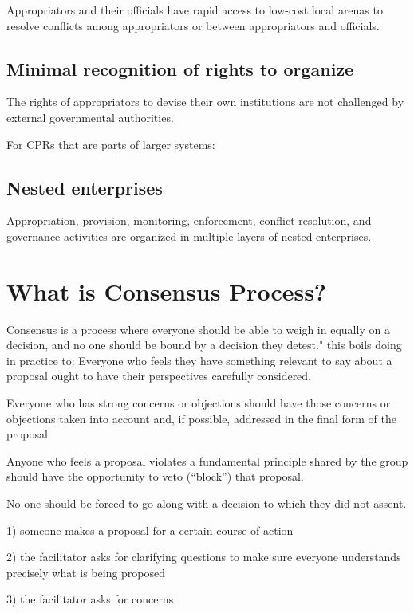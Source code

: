 \documentclass{article}
\begin{document}
Appropriators and their officials have rapid access to low-cost local arenas to resolve conflicts among appropriators or between appropriators and officials.

\subsection{Minimal recognition of rights to organize}

The rights of appropriators to devise their own institutions are not challenged by external governmental authorities.

For CPRs that are parts of larger systems:

\subsection{Nested enterprises}

Appropriation, provision, monitoring, enforcement, conflict resolution, and governance activities are organized in multiple layers of nested enterprises.





\pagebreak
\section{What is Consensus Process?}

Consensus is a process where everyone should be able to weigh in equally on a decision, and no one should be bound by a decision they detest."
this boils doing in practice to: Everyone who feels they have something relevant to say about a proposal ought to have their perspectives carefully considered.

Everyone who has strong concerns or objections should have those concerns or objections taken into account and, if possible, addressed in the final form of the proposal.

Anyone who feels a proposal violates a fundamental principle shared by the group should have the opportunity to veto (“block”) that proposal.

No one should be forced to go along with a decision to which they did not assent.

1) someone makes a proposal for a certain course of action

2) the facilitator asks for clarifying questions to make sure everyone understands precisely what is being proposed

3) the facilitator asks for concerns
\end{document}
